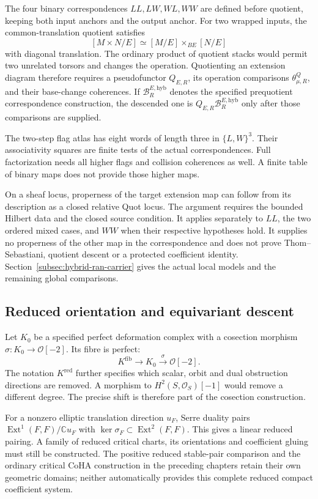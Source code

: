 The four binary correspondences \(LL,LW,WL,WW\) are defined
before quotient, keeping both input anchors and the output anchor.
For two wrapped inputs, the common-translation quotient satisfies
\[
 [M\times N/E]\simeq[M/E]\times_{BE}[N/E]
\]
with diagonal translation. The ordinary product of quotient stacks
would permit two unrelated torsors and changes the operation.
Quotienting an extension diagram therefore requires a
pseudofunctor \(Q_{E,R}\), its operation comparisons
\(\theta^Q_{\mu,R}\), and their base-change coherences.
If \(\mathcal B_R^{E,\mathrm{hyb}}\) denotes the specified
prequotient correspondence construction, the descended one is
\(Q_{E,R}\mathcal B_R^{E,\mathrm{hyb}}\) only after those
comparisons are supplied.

The two-step flag atlas has eight words of length three in
\(\{L,W\}^3\). Their associativity squares are finite tests of
the actual correspondences. Full factorization needs all higher
flags and collision coherences as well. A finite table of binary
maps does not provide those higher maps.

On a sheaf locus, properness of the target extension map can follow
from its description as a closed relative Quot locus. The argument
requires the bounded Hilbert data and the closed source condition.
It applies separately to \(LL\), the two ordered mixed cases,
and \(WW\) when their respective hypotheses hold. It supplies no
properness of the other map in the correspondence and does not
prove Thom--Sebastiani, quotient descent or a protected coefficient
identity. Section~\ref{subsec:hybrid-ran-carrier} gives the actual
local models and the remaining global comparisons.

\subsection{Reduced orientation and equivariant descent}
\label{app:build-orientation}

Let \(K_0\) be a specified perfect deformation complex with a
cosection morphism
\(\sigma:K_0\to\mathcal O[-2]\). Its fibre is perfect:
\[
 K^{\mathrm{fib}}\longrightarrow K_0
       \xrightarrow{\sigma}\mathcal O[-2].
\]
The notation \(K^{\mathrm{red}}\) further specifies which scalar,
orbit and dual obstruction directions are removed. A morphism to
\(H^2(S,\mathcal O_S)[-1]\) would remove a different degree.
The precise shift is therefore part of the cosection construction.

For a nonzero elliptic translation direction \(u_F\), Serre
duality pairs \(\operatorname{Ext}^1(F,F)/\mathbb Cu_F\)
with \(\ker\sigma_F\subset\operatorname{Ext}^2(F,F)\).
This gives a linear reduced pairing. A family of reduced critical
charts, its orientations and coefficient gluing must still be
constructed. The positive reduced stable-pair comparison and the
ordinary critical CoHA construction in the preceding chapters
retain their own geometric domains; neither automatically provides
this complete reduced compact coefficient system.

